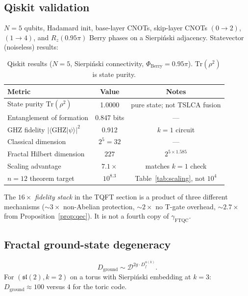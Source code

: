 \documentclass[aps,prx,twocolumn,superscriptaddress,floatfix]{revtex4-2}
\newcommand{\Df}{D_f}
\newcommand{\TraceOp}{\mathrm{Tr}}
\theoremstyle{plain}
\theoremstyle{definition}
\begin{document}
\subsection{Qiskit validation}

$N=5$ qubits, Hadamard init, base-layer CNOTs, skip-layer CNOTs $(0\to 2)$, $(1\to 4)$, and $R_z(0.95\pi)$ Berry phases on a Sierpi\'{n}ski adjacency. Statevector (noiseless) results:

\begin{table}[h]
\caption{Qiskit results ($N=5$, Sierpi\'{n}ski connectivity, $\Phi_{\mathrm{Berry}}=0.95\pi$). $\TraceOp(\rho^2)$ is state purity.}
\label{tab:qiskit}
\begin{ruledtabular}
\begin{tabular}{lcc}
\textbf{Metric} & \textbf{Value} & \textbf{Notes} \\
\hline
State purity $\TraceOp(\rho^2)$ & 1.0000 & pure state; not TSLCA fusion \\
Entanglement of formation & 0.847 bits & --- \\
GHZ fidelity $|\langle\mathrm{GHZ}|\psi\rangle|^2$ & 0.912 & $k=1$ circuit \\
Classical dimension & $2^5=32$ & --- \\
Fractal Hilbert dimension & $227$ & $2^{5\times 1.585}$ \\
Scaling advantage & $7.1\times$ & matches $k=1$ check \\
$n=12$ theorem target & $10^{8.3}$ & Table~\ref{tab:scaling}, not $10^4$ \\
\end{tabular}
\end{ruledtabular}
\end{table}

The $16\times$ \emph{fidelity stack} in the TQFT section is a product of three different mechanisms ($\sim 3\times$ non-Abelian protection, $\sim 2\times$ no T-gate overhead, $\sim 2.7\times$ from Proposition~\ref{prop:qec}). It is not a fourth copy of $\gamma_{\mathrm{FTQC}}$.

\subsection{Fractal ground-state degeneracy}

\begin{equation}
D_{\mathrm{ground}} \sim \mathcal{D}^{2g\cdot\Df^{\alpha(k)}}.
\end{equation}
For $(\mathfrak{sl}(2),k=2)$ on a torus with Sierpi\'{n}ski embedding at $k=3$: $D_{\mathrm{ground}}\approx 100$ versus $4$ for the toric code.
\end{document}
